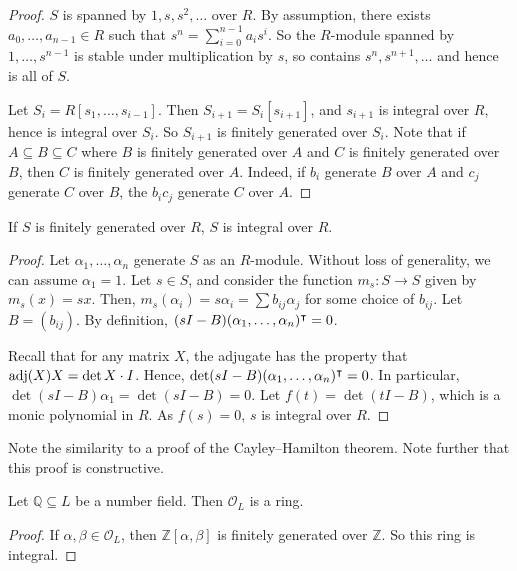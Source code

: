\begin{proof}
    \( S \) is spanned by \( 1, s, s^2, \dots \) over \( R \).
    By assumption, there exists \( a_0, \dots, a_{n-1} \in R \) such that \( s^n = \sum_{i=0}^{n-1} a_i s^i \).
    So the \( R \)-module spanned by \( 1, \dots, s^{n-1} \) is stable under multiplication by \( s \), so contains \( s^n, s^{n+1}, \dots \) and hence is all of \( S \).

    Let \( S_i = R[s_1, \dots, s_{i-1}] \).
    Then \( S_{i+1} = S_i[s_{i+1}] \), and \( s_{i+1} \) is integral over \( R \), hence is integral over \( S_i \).
    So \( S_{i+1} \) is finitely generated over \( S_i \).
    Note that if \( A \subseteq B \subseteq C \) where \( B \) is finitely generated over \( A \) and \( C \) is finitely generated over \( B \), then \( C \) is finitely generated over \( A \).
    Indeed, if \( b_i \) generate \( B \) over \( A \) and \( c_j \) generate \( C \) over \( B \), the \( b_i c_j \) generate \( C \) over \( A \).
\end{proof}
\begin{theorem}
    If \( S \) is finitely generated over \( R \), \( S \) is integral over \( R \).
\end{theorem}
\begin{proof}
    Let \( \alpha_1, \dots, \alpha_n \) generate \( S \) as an \( R \)-module.
    Without loss of generality, we can assume \( \alpha_1 = 1 \).
    Let \( s \in S \), and consider the function \( m_s \colon S \to S \) given by \( m_s(x) = sx \).
    Then, \( m_s(\alpha_i) = s\alpha_i = \sum b_{ij} \alpha_j \) for some choice of \( b_{ij} \).
    Let \( B = (b_{ij}) \).
    By definition, \( (sI - B) (\alpha_1, \dots, \alpha_n)^\intercal = 0 \).

    Recall that for any matrix \( X \), the adjugate has the property that \( \operatorname{adj}(X) X = \det X \cdot I \).
    Hence, \( \det(sI - B) (\alpha_1, \dots, \alpha_n)^\intercal = 0 \).
    In particular, \( \det(sI - B) \alpha_1 = \det(sI - B) = 0 \).
    Let \( f(t) = \det(tI - B) \), which is a monic polynomial in \( R \).
    As \( f(s) = 0 \), \( s \) is integral over \( R \).
\end{proof}
Note the similarity to a proof of the Cayley--Hamilton theorem.
Note further that this proof is constructive.
\begin{corollary}
    Let \( \mathbb Q \subseteq L \) be a number field.
    Then \( \mathcal O_L \) is a ring.
\end{corollary}
\begin{proof}
    If \( \alpha, \beta \in \mathcal O_L \), then \( \mathbb Z[\alpha, \beta] \) is finitely generated over \( \mathbb Z \).
    So this ring is integral.
\end{proof}
